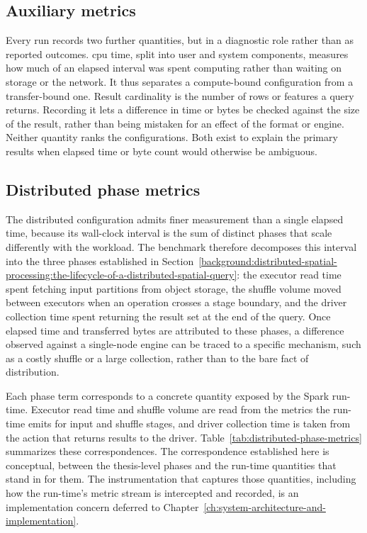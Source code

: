 \subsection{Auxiliary metrics}
\label{research-design-and-methodology:metrics-and-cost-model:auxiliary-metrics}

Every run records two further quantities, but in a diagnostic role rather than as reported outcomes. \acrshort{cpu} time, split into user and system components, measures how much of an elapsed interval was spent computing rather than waiting on storage or the network. It thus separates a compute-bound configuration from a transfer-bound one. Result cardinality is the number of rows or features a query returns. Recording it lets a difference in time or bytes be checked against the size of the result, rather than being mistaken for an effect of the format or engine. Neither quantity ranks the configurations. Both exist to explain the primary results when elapsed time or byte count would otherwise be ambiguous.

\subsection{Distributed phase metrics}
\label{research-design-and-methodology:metrics-and-cost-model:distributed-phase-metrics}

The distributed configuration admits finer measurement than a single elapsed time, because its wall-clock interval is the sum of distinct phases that scale differently with the workload. The benchmark therefore decomposes this interval into the three phases established in Section~\ref{background:distributed-spatial-processing:the-lifecycle-of-a-distributed-spatial-query}: the executor read time spent fetching input partitions from object storage, the shuffle volume moved between executors when an operation crosses a stage boundary, and the driver collection time spent returning the result set at the end of the query. Once elapsed time and transferred bytes are attributed to these phases, a difference observed against a single-node engine can be traced to a specific mechanism, such as a costly shuffle or a large collection, rather than to the bare fact of distribution.

Each phase term corresponds to a concrete quantity exposed by the Spark run-time. Executor read time and shuffle volume are read from the metrics the run-time emits for input and shuffle stages, and driver collection time is taken from the action that returns results to the driver. Table~\ref{tab:distributed-phase-metrics} summarizes these correspondences. The correspondence established here is conceptual, between the thesis-level phases and the run-time quantities that stand in for them. The instrumentation that captures those quantities, including how the run-time's metric stream is intercepted and recorded, is an implementation concern deferred to Chapter~\ref{ch:system-architecture-and-implementation}.

